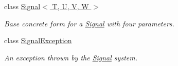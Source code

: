 \begin{DoxyCompactItemize}
class \hyperlink{classstrange_1_1extensions_1_1signal_1_1impl_1_1_signal_3_01_t_00_01_u_00_01_v_00_01_w_01_4}{Signal$<$ T, U, V, W $>$}
\begin{DoxyCompactList}\small\item\em Base concrete form for a \hyperlink{classstrange_1_1extensions_1_1signal_1_1impl_1_1_signal}{Signal} with four parameters. \end{DoxyCompactList}\item 
class \hyperlink{classstrange_1_1extensions_1_1signal_1_1impl_1_1_signal_exception}{Signal\-Exception}
\begin{DoxyCompactList}\small\item\em An exception thrown by the \hyperlink{classstrange_1_1extensions_1_1signal_1_1impl_1_1_signal}{Signal} system. \end{DoxyCompactList}\end{DoxyCompactItemize}
